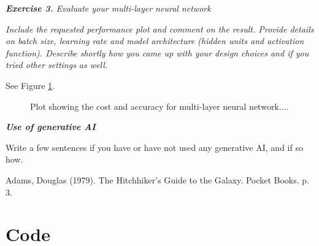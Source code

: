 \documentclass[a4paper,10pt]{article}
\begin{document}
	
	\hfill \break
	\textit{\textbf{Exercise 3.} Evaluate your multi-layer neural network}
	
	\textit{Include the requested performance plot and comment on the result.
	Provide details on batch size, learning rate and model architecture (hidden units and activation function). Describe shortly how you came up with your design choices and if you tried other settings as well.}

	See Figure \ref{fig:cost_per_iteration_nn}.
	
	\begin{figure}[H]
		\centering
		\caption{Plot showing the cost and accuracy for multi-layer neural network....}
		\label{fig:cost_per_iteration_nn}
	\end{figure}	
	
	\hfill \break
	\textit{\textbf{Use of generative AI}}
	
	Write a few sentences if you have or have not used any generative AI, and if so how.
	
	
	
	\begin{thebibliography}{1}
		
		 Adams, Douglas (1979). The Hitchhiker's Guide to the Galaxy. Pocket Books. p. 3.
		
	\end{thebibliography}
	
	\pagebreak
	
	\appendix
	\section{Code}
	\label{app:code}
	
	\inputminted[frame=lines,framesep=2mm,linenos]{python}{my_code.py}
	
\end{document}
